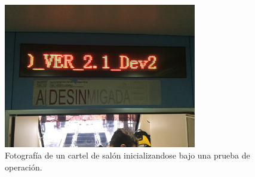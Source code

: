 \begin{figure}[ht]
	\centering
	\includegraphics[width=0.75\textwidth]{./Figures/cartelIniciando.JPG}
	\caption{Fotografía de un cartel de salón inicializandose bajo una prueba de operación.}
	\label{fig:cartelIniciando}
\end{figure}
